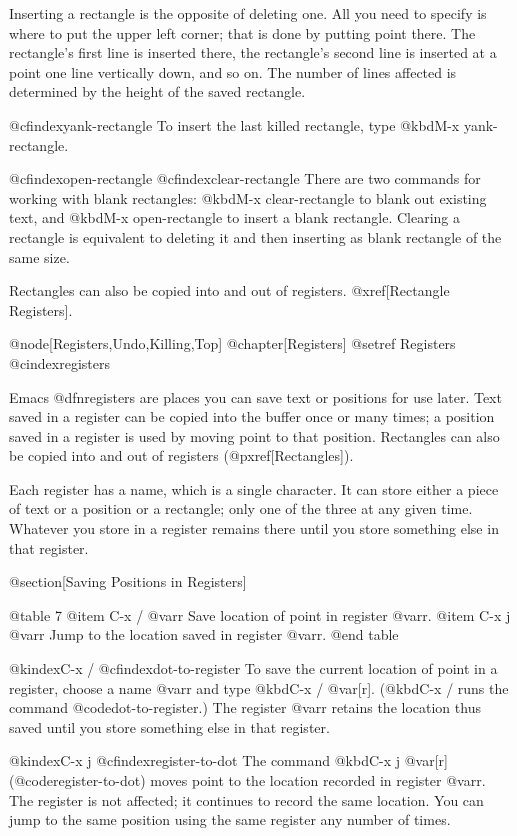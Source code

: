 {{{{{{  Inserting a rectangle is the opposite of deleting one.  All you need to
specify is where to put the upper left corner; that is done by putting
point there.  The rectangle's first line is inserted there, the rectangle's
second line is inserted at a point one line vertically down, and so on.
The number of lines affected is determined by the height of the saved
rectangle.

@cfindex{yank-rectangle}
  To insert the last killed rectangle, type @kbd{M-x yank-rectangle}.

@cfindex{open-rectangle}
@cfindex{clear-rectangle}
  There are two commands for working with blank rectangles: @kbd{M-x
clear-rectangle} to blank out existing text, and @kbd{M-x open-rectangle}
to insert a blank rectangle.  Clearing a rectangle is equivalent to
deleting it and then inserting as blank rectangle of the same size.

  Rectangles can also be copied into and out of registers.  @xref[Rectangle
Registers].

@node[Registers,Undo,Killing,Top]
@chapter[Registers]
@setref Registers
@cindex{registers}

  Emacs @dfn{registers} are places you can save text or positions for
use later.  Text saved in a register can be copied into the buffer
once or many times; a position saved in a register is used by moving
point to that position.  Rectangles can also be copied into and out of
registers (@pxref[Rectangles]).

  Each register has a name, which is a single character.  It can store
either a piece of text or a position or a rectangle; only one of the three
at any given time.  Whatever you store in a register remains there until
you store something else in that register.

@section[Saving Positions in Registers]

@table 7
@item C-x / @var{r}
Save location of point in register @var{r}.
@item C-x j @var{r}
Jump to the location saved in register @var{r}.
@end table

@kindex{C-x /}
@cfindex{dot-to-register}
  To save the current location of point in a register, choose a name
@var{r} and type @kbd{C-x / @var[r]}.  (@kbd{C-x /} runs the command
@code{dot-to-register}.)  The register @var{r} retains the location thus
saved until you store something else in that register.

@kindex{C-x j}
@cfindex{register-to-dot}
  The command @kbd{C-x j @var[r]} (@code{register-to-dot}) moves
point to the location recorded in register @var{r}.  The register is not
affected; it continues to record the same location.  You can jump to the
same position using the same register any number of times.

}}}}}}
